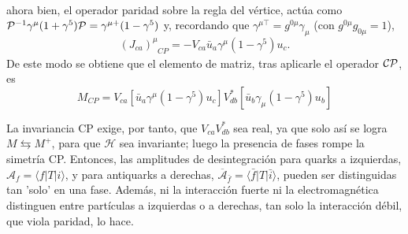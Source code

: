 \begin{subappendices}
\begin{align*}
\end{align*}
ahora bien, el operador paridad sobre la regla del vértice, actúa como 
$\mathcal{P}^{-1} \gamma^{\mu} (1+ \gamma^5) \mathcal{P} = \gamma^{\mu +} (1- \gamma^5)$ y, recordando que $\gamma^{\mu \top} = g^{0\mu} \gamma_{\mu}$ (con $g^{0 \mu} g_{0 \mu} = 1$),
\[(J_{ca})_{\phantom{\mu} CP}^{\mu} = - V_{ca} \bar{u}_a \gamma^{\mu} (1- \gamma^5) u_c.\]
De este modo se obtiene que el elemento de matriz, tras aplicarle el operador $\mathcal{CP}$, es
\[M_{CP} = V_{ca}  [\bar{u}_a \gamma^{\mu} (1-\gamma^5)  u_c ] V_{db}^* [\bar{u}_b \gamma_{\mu} (1 -\gamma^5) u_b]\]

La invariancia CP exige, por tanto, que $V_{ca} V_{db}^*$ sea real, ya que solo así se logra $M \leftrightarrows M^+$, para que $\mathcal{H}$ sea invariante; luego la presencia de fases rompe la simetría CP.
%
Entonces, las amplitudes de desintegración para quarks a izquierdas, $\mathcal{A}_f = \langle f |T|i\rangle$, y para antiquarks a derechas, $\overline{\mathcal{A}}_{\bar{f}} = \langle \bar f |T| \bar i\rangle$, pueden ser distinguidas tan 'solo' en una fase. Además, ni la interacción fuerte ni la electromagnética distinguen entre partículas a izquierdas o a derechas, tan solo la interacción débil, que viola paridad, lo hace.

	
\end{subappendices}

